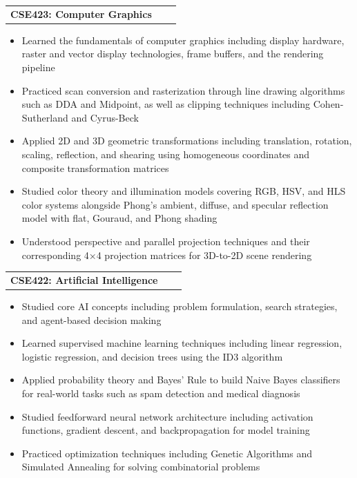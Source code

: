 \documentclass[a4paper,12pt]{article}
\makeatletter
\newenvironment{joblong}[2]
    {
    \begin{tabularx}{\linewidth}{@{}l X r@{}}
    \textbf{#1} & \hfill &  #2 \\[3.75pt]
    \end{tabularx}
    \begin{minipage}[t]{\linewidth}
    \begin{itemize}[nosep,after=\strut, leftmargin=1em, itemsep=3pt,label=--]
    }
    {
    \end{itemize}
    \end{minipage}    
    }
\makeatother
\begin{document}
\begin{joblong}{CSE423: Computer Graphics}{}
    \item Learned the fundamentals of computer graphics including display hardware, raster and vector display technologies, frame buffers, and the rendering pipeline
    \item Practiced scan conversion and rasterization through line drawing algorithms such as DDA and Midpoint, as well as clipping techniques including Cohen-Sutherland and Cyrus-Beck
    \item Applied 2D and 3D geometric transformations including translation, rotation, scaling, reflection, and shearing using homogeneous coordinates and composite transformation matrices
    \item Studied color theory and illumination models covering RGB, HSV, and HLS color systems alongside Phong's ambient, diffuse, and specular reflection model with flat, Gouraud, and Phong shading
    \item Understood perspective and parallel projection techniques and their corresponding 4×4 projection matrices for 3D-to-2D scene rendering
\end{joblong}

\begin{joblong}{CSE422: Artificial Intelligence}{}
    \item Studied core AI concepts including problem formulation, search strategies, and agent-based decision making
    \item Learned supervised machine learning techniques including linear regression, logistic regression, and decision trees using the ID3 algorithm
    \item Applied probability theory and Bayes' Rule to build Naive Bayes classifiers for real-world tasks such as spam detection and medical diagnosis
    \item Studied feedforward neural network architecture including activation functions, gradient descent, and backpropagation for model training
    \item Practiced optimization techniques including Genetic Algorithms and Simulated Annealing for solving combinatorial problems
\end{joblong}
\end{document}
